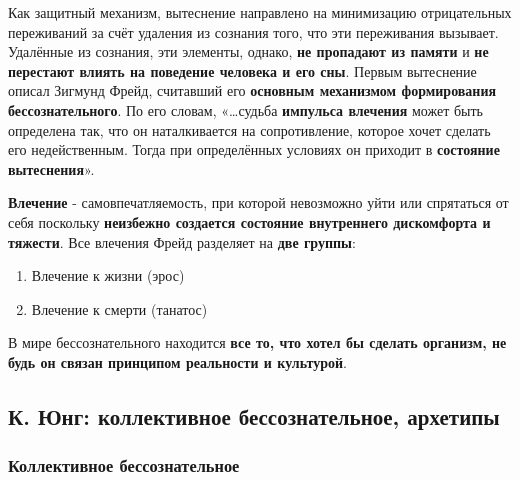 \documentclass{article}
\begin{document}
\begin{flushleft}
Как защитный механизм, вытеснение направлено на минимизацию отрицательных переживаний за счёт удаления из сознания того, что эти переживания вызывает. Удалённые из сознания, эти элементы, однако, \textbf{не пропадают из памяти} и \textbf{не перестают влиять на поведение человека и его сны}. Первым вытеснение описал Зигмунд Фрейд, считавший его \textbf{основным механизмом формирования бессознательного}. По его словам, «…судьба \textbf{импульса влечения} может быть определена так, что он наталкивается на сопротивление, которое хочет сделать его недейственным. Тогда при определённых условиях он приходит в \textbf{состояние вытеснения}».

\hfill

\textbf{Влечение} - самовпечатляемость, при которой невозможно уйти или спрятаться от себя поскольку \textbf{неизбежно создается состояние внутреннего дискомфорта и тяжести}. Все влечения Фрейд разделяет на \textbf{две группы}:

\begin{enumerate}
    \item Влечение к жизни (эрос)
    \item Влечение к смерти (танатос)
\end{enumerate}

В мире бессознательного находится \textbf{все то, что хотел бы сделать организм, не будь он связан принципом реальности и культурой}.

\end{flushleft}

\pagebreak
\subsection{К. Юнг: коллективное бессознательное, архетипы}

\subsubsection{Коллективное бессознательное}
\end{document}
